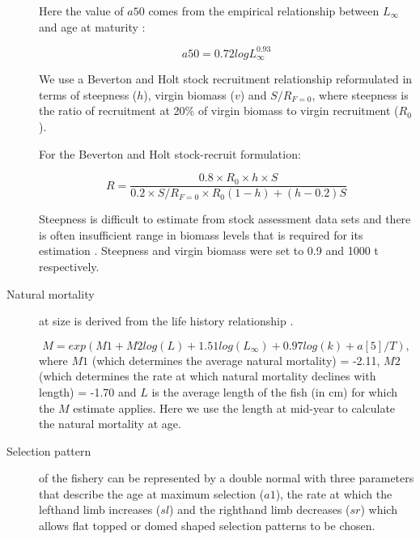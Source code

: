 \documentclass[%
nonumbib,      %
%
]{nrc1}                          %
\begin{document}
\begin{description}
Here the value of $a50$ comes from the empirical relationship between $L_{\infty}$ and age at maturity \cite{gislason2008coexistence}:

\begin{equation}
  a50=0.72 logL_{\infty}^{0.93}
\end{equation}

We use a Beverton and Holt stock recruitment relationship reformulated in terms of steepness ($h$), virgin biomass ($v$) and $S/R_{F=0}$, 
where steepness is the ratio of recruitment at 20\% of virgin biomass to virgin recruitment ($R_0$). 

For the Beverton and Holt stock-recruit formulation:

\begin{equation}
R=\frac{0.8 \times R_0 \times h \times S}{0.2 \times S/R_{F=0} \times R_0(1-h)+(h-0.2)S}
\end{equation} 

Steepness is difficult to estimate from stock assessment data sets and there is often insufficient range in biomass levels that is required for its estimation \cite{issf2011steep}.
Steepness and virgin biomass were set to 0.9 and 1000 t respectively.

\item[Natural mortality]
at size is derived from the life history relationship \cite{gislason2010does}.
               
\begin{equation}
            M = exp(M1 + M2 log(L) + 1.51log(L_{\infty}) + 0.97log(k) + a[5]/T),
\end{equation} 
where $M1$ (which determines the average natural mortality) = -2.11, $M2$ (which determines the rate at which natural mortality declines with length) = -1.70 and $L$ is 
the average length of the fish (in cm) for which the $M$ estimate applies. Here we use the length at mid-year to calculate the natural mortality at age.


\item[Selection pattern] 
of the fishery can be represented by a double normal 
with three parameters that describe the age at maximum selection ($a1$), the rate at which the lefthand 
limb increases ($sl$) and the righthand limb decreases ($sr$) which allows flat topped or domed shaped selection patterns to be chosen.


\end{description}
\end{document}
